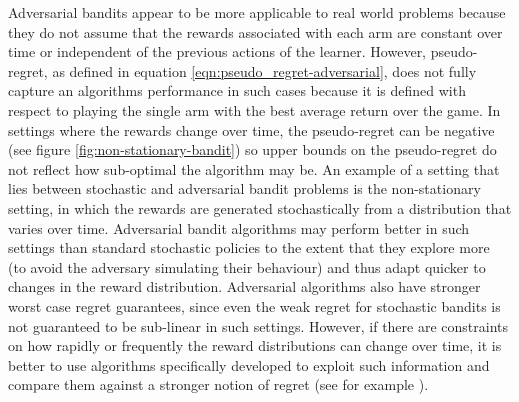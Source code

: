 \documentclass[11pt,a4paper,twoside]{report}
\theoremstyle{plain}
\theoremstyle{definition}
\begin{document}
Adversarial bandits appear to be more applicable to real world problems because they do not assume that the rewards associated with each arm are constant over time or independent of the previous actions of the learner. However, pseudo-regret, as defined in equation \ref{eqn:pseudo_regret-adversarial}, does not fully capture an algorithms performance in such cases because it is defined with respect to playing the single arm with the best average return over the game. In settings where the rewards change over time, the pseudo-regret can be negative (see figure \ref{fig:non-stationary-bandit}) so upper bounds on the pseudo-regret do not reflect how sub-optimal the algorithm may be. An example of a setting that lies between stochastic and adversarial bandit problems is the non-stationary setting, in which the rewards are generated stochastically from a distribution that varies over time. Adversarial bandit algorithms may perform better in such settings than standard stochastic policies to the extent that they explore more (to avoid the adversary simulating their behaviour) and thus adapt quicker to changes in the reward distribution. Adversarial algorithms also have stronger worst case regret guarantees, since even the weak regret for stochastic bandits is not guaranteed to be sub-linear in such settings. However, if there are constraints on how rapidly or frequently the reward distributions can change over time, it is better to use algorithms specifically developed to exploit such information and compare them against a stronger notion of regret (see for example \citep{garivier2008upper,Garivier2011a,Besbes2014}). 
\end{document}
